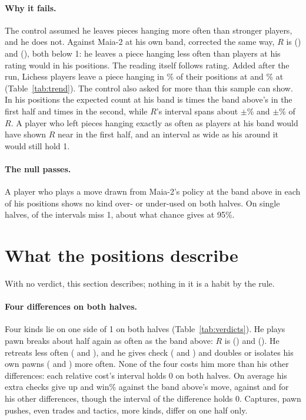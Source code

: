 \documentclass[11pt]{article}
\begin{document}
\paragraph{Why it fails.} The control assumed he leaves pieces hanging more often than stronger
players, and he does not. Against Maia-2 at his own band, corrected the same way, $R$ is
\HangsRhisFirst{} (\HangsRhisFirstCi) and \HangsRhisSecond{} (\HangsRhisSecondCi), both below 1:
he leaves a piece hanging less often than players at his rating would in his positions. The
reading itself follows rating. Added after the run, Lichess players leave a piece hanging in
\LiHangsLow\% of their positions at \BandLowest{} and \LiHangsHigh\% at \BandHighest{}
(Table~\ref{tab:trend}). The control also asked for more than this sample can show. In his
positions the expected count at his band is \StepFirst{} times the band above's in the first half
and \StepSecond{} times in the second, while $R$'s interval spans about $\pm$\SpreadFirst\% and
$\pm$\SpreadSecond\% of $R$. A player who left pieces hanging exactly as often as players at his
band would have shown $R$ near \StepFirst{} in the first half, and an interval as wide as his
around it would still hold 1.

\paragraph{The null passes.} A player who plays a move drawn from Maia-2's policy at the band
above in each of his positions shows no kind over- or under-used on both halves. On single
halves, \NullMisses{} of the \NullIntervals{} intervals miss 1, about what chance gives at 95\%.

\section{What the positions describe}

With no verdict, this section describes; nothing in it is a habit by the rule.

\VerdictTable

\paragraph{Four differences on both halves.} Four kinds lie on one side of 1 on both halves
(Table~\ref{tab:verdicts}). He plays pawn breaks about half again as often as the band above:
$R$ is \BreakRFirst{} (\BreakRFirstCi) and \BreakRSecond{} (\BreakRSecondCi). He retreats less
often (\RetreatRFirst{} and \RetreatRSecond), and he gives check (\CheckRFirst{} and \CheckRSecond)
and doubles or isolates his own pawns (\WeakRFirst{} and \WeakRSecond) more often. None of the
four costs him more than his other differences: each relative cost's interval holds 0 on both
halves. On average his extra checks give up \CheckDFirst{} and \CheckDSecond{} win\% against the
band above's move, against \CheckRefFirst{} and \CheckRefSecond{} for his other differences, though the
interval of the difference holds 0. Captures, pawn pushes, even trades and tactics, \OneHalf{}
more kinds, differ on one half only.
\end{document}
